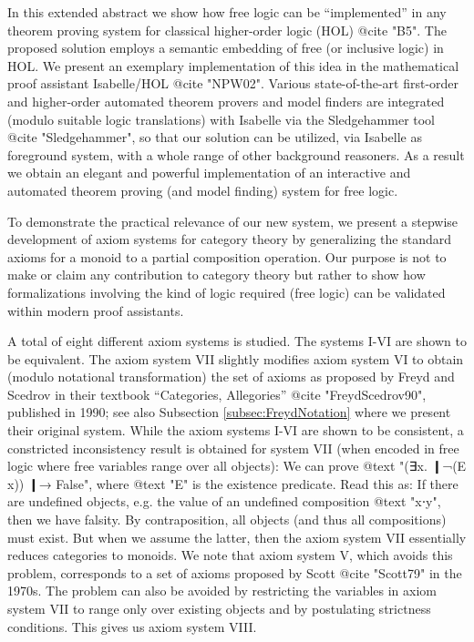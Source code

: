 In this extended abstract we show how free logic can be
``implemented'' in any theorem proving system for classical
higher-order logic (HOL) @{cite "B5"}. The proposed solution employs a
semantic embedding of free (or inclusive logic) in HOL. We present an
exemplary implementation of this idea in the mathematical proof
assistant Isabelle/HOL @{cite "NPW02"}. Various state-of-the-art
first-order and higher-order automated theorem provers and model
finders are integrated (modulo suitable logic translations) with
Isabelle via the Sledgehammer tool @{cite "Sledgehammer"}, so that our
solution can be utilized, via Isabelle as foreground system, with a
whole range of other background reasoners. As a result we obtain an
elegant and powerful implementation of an interactive and automated
theorem proving (and model finding) system for free logic.
  
To demonstrate the practical relevance of our new system, we present a
stepwise development of axiom systems for category theory by
generalizing the standard axioms for a monoid to a partial composition
operation. Our purpose is not to make or claim any contribution to
category theory but rather to show how formalizations involving the
kind of logic required (free logic) can be validated within modern
proof assistants.

A total of eight different axiom systems is studied. The systems I-VI are shown to 
be equivalent. The axiom system VII slightly modifies axiom system VI to obtain (modulo 
notational transformation) the set of axioms as proposed by  Freyd and Scedrov in their textbook
 ``Categories, Allegories'' @{cite "FreydScedrov90"}, published in 1990; 
see also Subsection \ref{subsec:FreydNotation} where we present their original system.
While the axiom systems I-VI are shown to be  consistent, a constricted inconsistency result is 
obtained for system VII (when encoded in free logic where free variables range over all 
objects): We can prove @{text "(∃x. ❙¬(E x)) ❙→ False"}, where @{text "E"} is the existence predicate. Read this as: If there 
are undefined objects, e.g. the value of an undefined composition @{text "x⋅y"}, then we have falsity.
By contraposition, all objects (and thus all compositions) must exist. But when we assume the latter,
then the axiom system VII essentially reduces categories to monoids.
We note that axiom system V, which avoids this problem, corresponds to a set of axioms proposed 
by Scott @{cite "Scott79"} in the 1970s. The problem can also be avoided by restricting the variables 
in axiom system VII to range only over existing objects and by postulating strictness conditions. 
This gives us axiom system VIII.

